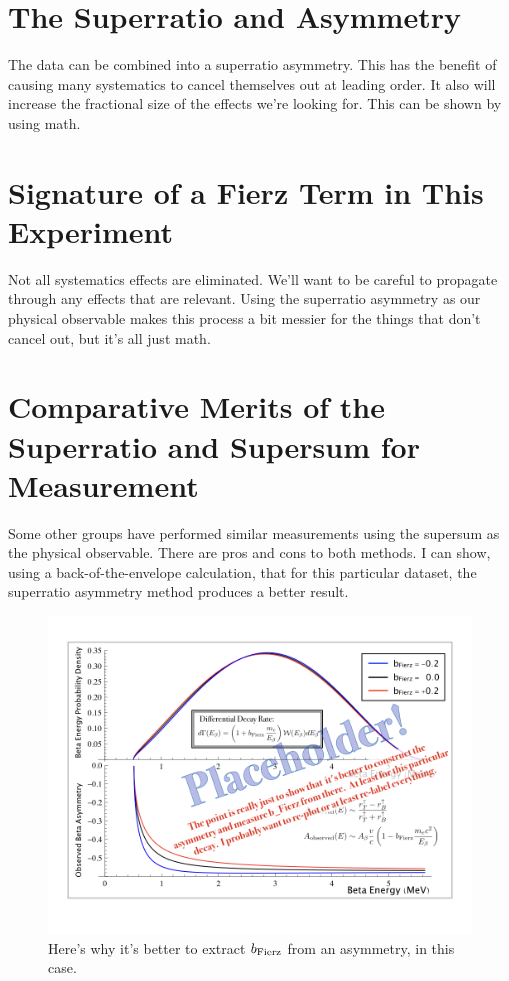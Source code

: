 



\section{The Superratio and Asymmetry}
The data can be combined into a superratio asymmetry.  This has the benefit of causing many systematics to cancel themselves out at leading order.  It also will increase the fractional size of the effects we're looking for.  This can be shown by using math.  

\section{Signature of a Fierz Term in This Experiment}
Not all systematics effects are eliminated.  We'll want to be careful to propagate through any effects that are relevant.  Using the superratio asymmetry as our physical observable makes this process a bit messier for the things that don't cancel out, but it's all just math.  

\section{Comparative Merits of the Superratio and Supersum for Measurement}
Some other groups have performed similar measurements using the supersum as the physical observable.  There are pros and cons to both methods.  I can show, using a back-of-the-envelope calculation, that for this particular dataset, the superratio asymmetry method produces a better result.  

\begin{figure}[h!!t]
	\centering
	\includegraphics[width=.999\linewidth]
	{Figures/SuperSumSuperRatio_prelim}
	\caption{Here's why it's better to extract $b_{\mathrm{Fierz}}$ from an asymmetry, in this case.}	
	\label{fig:supersumsuperratio}
\end{figure}

